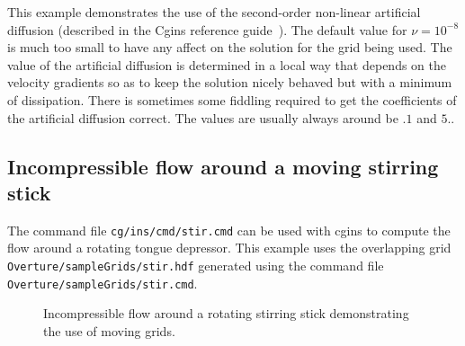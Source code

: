 \documentclass{article}
\newcommand{\Index}[1]{#1\index{#1}}
\newcommand{\obFigures}{\homeHenshaw/res/OverBlown/docFigures}  %
\begin{document}
This example demonstrates the use of the second-order non-linear \Index{artificial diffusion} (described in the
Cgins reference guide~\cite{CginsReferenceGuide}). The default value for $\nu=10^{-8}$ is much too
small to have any affect on the solution for the grid being used. 
The value of the artificial diffusion is determined in a local way
that depends on the velocity gradients so as to keep the solution nicely behaved but
with a minimum of dissipation. There is sometimes some fiddling required to get the coefficients
of the artificial diffusion correct. The values are usually always around be $.1$ and $5.$.


\subsection{Incompressible flow around a moving stirring stick}

The command file {\tt cg/ins/cmd/stir.cmd} can be used with cgins to compute the
flow around a rotating tongue depressor.
This example uses the overlapping grid {\tt Overture/\-sampleGrids/\-stir.hdf}  generated
using the command file {\tt Overture/\-sampleGrids/\-stir.cmd}.
\noindent

{
\begin{figure}[hbt]
\newcommand{\figWidtha}{9.cm}
\newcommand{\trimfiga}[2]{\trimPlot{#1}{#2}{.0}{.0}{.08}{.025}}
\begin{center}
\end{center} 
 \caption{Incompressible flow around a rotating stirring stick demonstrating the use of moving grids.}
\end{figure}
}

\end{document}

